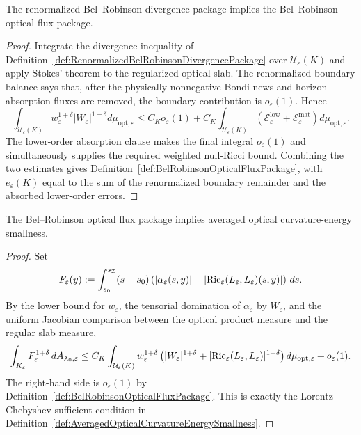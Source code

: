 \begin{theorem}\label{thm:DivergenceBelRobinsonOpticalFlux}
The renormalized Bel--Robinson divergence package implies the Bel--Robinson optical flux package.
\end{theorem}

\begin{proof}
Integrate the divergence inequality of Definition~\ref{def:RenormalizedBelRobinsonDivergencePackage} over $\mathcal U_\varepsilon(K)$ and apply Stokes' theorem to the regularized optical slab. The renormalized boundary balance says that, after the physically nonnegative Bondi news and horizon absorption fluxes are removed, the boundary contribution is $o_\varepsilon(1)$. Hence
\[
    \int_{\mathcal U_\varepsilon(K)}
    w_\varepsilon^{1+\delta}|W_\varepsilon|^{1+\delta}
    d\mu_{\mathrm{opt},\varepsilon}
    \le
    C_K o_\varepsilon(1)
    +
    C_K
    \int_{\mathcal U_\varepsilon(K)}
    \left(
        \mathcal E_{\varepsilon}^{\mathrm{low}}
        +\mathcal E_{\varepsilon}^{\mathrm{mat}}
    \right)d\mu_{\mathrm{opt},\varepsilon}.
\]
The lower-order absorption clause makes the final integral $o_\varepsilon(1)$ and simultaneously supplies the required weighted null-Ricci bound. Combining the two estimates gives Definition~\ref{def:BelRobinsonOpticalFluxPackage}, with $e_\varepsilon(K)$ equal to the sum of the renormalized boundary remainder and the absorbed lower-order errors.
\end{proof}

\begin{lemma}\label{lem:BelRobinsonFluxAveragedEnergy}
The Bel--Robinson optical flux package implies averaged optical curvature-energy smallness.
\end{lemma}

\begin{proof}
Set
\[
    F_\varepsilon(y)
    :=
    \int_{s_0}^{s_{\mathcal{I}}}
    (s-s_0)
    \left(
        |\alpha_\varepsilon(s,y)|
        +|\mathrm{Ric}_\varepsilon(L_\varepsilon,L_\varepsilon)(s,y)|
    \right)\,ds .
\]
By the lower bound for $w_\varepsilon$, the tensorial domination of $\alpha_\varepsilon$ by $W_\varepsilon$, and the uniform Jacobian comparison between the optical product measure and the regular slab measure,
\[
    \int_{K_\varepsilon}F_\varepsilon^{1+\delta}\,dA_{\lambda_0,\varepsilon}
    \le
    C_K
    \int_{\mathcal U_\varepsilon(K)}
    w_\varepsilon^{1+\delta}
    \left(
        |W_\varepsilon|^{1+\delta}
        +|\mathrm{Ric}_\varepsilon(L_\varepsilon,L_\varepsilon)|^{1+\delta}
    \right)
    d\mu_{\mathrm{opt},\varepsilon}
    +o_\varepsilon(1).
\]
The right-hand side is $o_\varepsilon(1)$ by Definition~\ref{def:BelRobinsonOpticalFluxPackage}. This is exactly the Lorentz--Chebyshev sufficient condition in Definition~\ref{def:AveragedOpticalCurvatureEnergySmallness}.
\end{proof}

